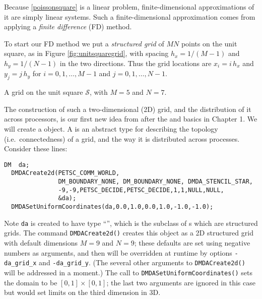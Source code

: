 Because \eqref{poissonsquare} is a linear problem, finite-dimensional approximations of it are simply linear systems.  Such a finite-dimensional approximation comes from applying a \emph{finite difference} (FD) method.

To start our FD method we put a \emph{structured grid} of $MN$ points on the unit square, as in Figure \ref{fig:unitsquaregrid}, with spacing $h_x=1/(M-1)$ and $h_y=1/(N-1)$ in the two directions.  Thus the grid locations are $x_i = i\, h_x$ and $y_j = j\, h_y$ for $i = 0,1,\dots,M-1$ and $j=0,1,\dots,N-1$.

\begin{marginfigure}
\caption{A grid on the unit square $\mathcal{S}$, with $M=5$ and $N=7$.}
\label{fig:unitsquaregrid}
\end{marginfigure}

The construction of such a two-dimensional (2D) grid, and the distribution of it across processors, is our first new idea from \PETSc after the \pVec and \pMat basics in Chapter 1.  We will create a \PETSc \pDM object.  A \pDM is an abstract type for describing the topology (i.e.~connectedness) of a grid, and the way it is distributed across \MPI processes.  Consider these lines:
\begin{Verbatim}[fontsize=\small]
  DM  da;
  DMDACreate2d(PETSC_COMM_WORLD,
               DM_BOUNDARY_NONE, DM_BOUNDARY_NONE, DMDA_STENCIL_STAR,
               -9,-9,PETSC_DECIDE,PETSC_DECIDE,1,1,NULL,NULL,
               &da);
  DMDASetUniformCoordinates(da,0.0,1.0,0.0,1.0,-1.0,-1.0);
\end{Verbatim}
\medskip\noindent
Note \texttt{da} is created to have type ``\pDMDA'', which is the subclass of \pDM s which are structured grids.  The command \texttt{DMDACreate2d()} creates this object as a 2D structured grid with default dimensions $M=9$ and $N=9$; these defaults are set using negative numbers as arguments, and then will be overridden at runtime by options \texttt{-da\_grid\_x} and \texttt{-da\_grid\_y}.  (The several other arguments to \texttt{DMDACreate2d()} will be addressed in a moment.)  The call to \texttt{DMDASetUniformCoordinates()} sets the domain to be $[0,1]\times[0,1]$; the last two arguments are ignored in this case but would set limits on the third dimension in 3D.


